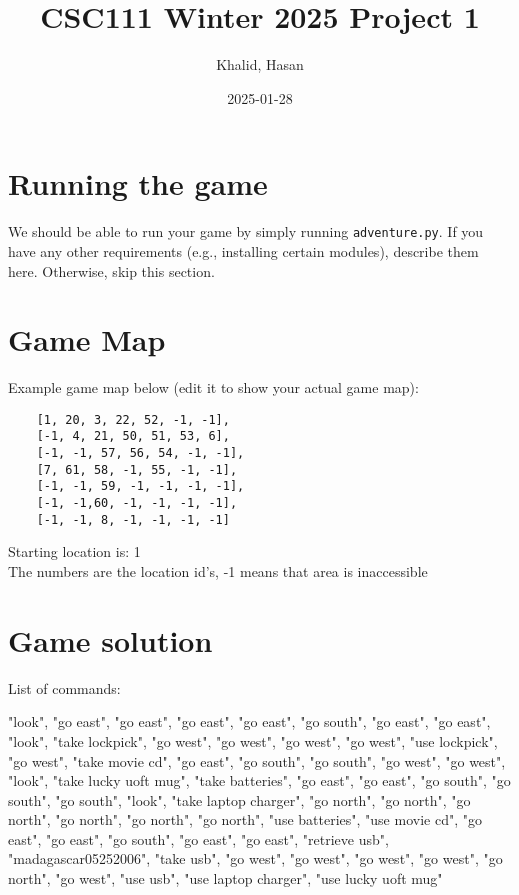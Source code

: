 \documentclass[11pt]{article}
\title{CSC111 Winter 2025 Project 1}
\author{Khalid, Hasan}
\date{2025-01-28}
\begin{document}
\maketitle

\section*{Running the game}
We should be able to run your game by simply running \texttt{adventure.py}. If you have any other requirements (e.g.,
installing certain modules), describe them here. Otherwise, skip this section.

\section*{Game Map}
Example game map below (edit it to show your actual game map):

\begin{verbatim}
    [1, 20, 3, 22, 52, -1, -1],
    [-1, 4, 21, 50, 51, 53, 6],
    [-1, -1, 57, 56, 54, -1, -1],
    [7, 61, 58, -1, 55, -1, -1],
    [-1, -1, 59, -1, -1, -1, -1],
    [-1, -1,60, -1, -1, -1, -1],
    [-1, -1, 8, -1, -1, -1, -1]

\end{verbatim}

Starting location is: 1 \\
The numbers are the location id's, -1 means that area is inaccessible

\section*{Game solution}
List of commands:

"look", "go east", "go east", "go east", "go east", "go south", "go east", "go east", "look",
        "take lockpick", "go west", "go west", "go west", "go west", "use lockpick", "go west",
        "take movie cd", "go east", "go south", "go south", "go west", "go west", "look",
        "take lucky uoft mug", "take batteries", "go east", "go east", "go south", "go south",
        "go south", "look", "take laptop charger", "go north", "go north", "go north", "go north",
        "go north", "go north", "use batteries", "use movie cd", "go east", "go east",
        "go south", "go east", "go east", "retrieve usb", "madagascar05252006", "take usb",
        "go west", "go west", "go west", "go west", "go north", "go west",
        "use usb", "use laptop charger", "use lucky uoft mug"
\end{document}
